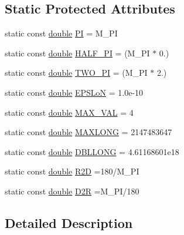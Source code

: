 \subsection*{Static Protected Attributes}
\begin{DoxyCompactItemize}
\item 
static const \hyperlink{_super_l_u_support_8h_a8956b2b9f49bf918deed98379d159ca7}{double} \hyperlink{group___o_p_map_widget_gaab58a4dd2b2aec1a140df479c3da07c5}{P\-I} = M\-\_\-\-P\-I
\item 
static const \hyperlink{_super_l_u_support_8h_a8956b2b9f49bf918deed98379d159ca7}{double} \hyperlink{group___o_p_map_widget_ga767800d1664d3a7d0255a1d1d55bea69}{H\-A\-L\-F\-\_\-\-P\-I} = (M\-\_\-\-P\-I $\ast$ 0.)
\item 
static const \hyperlink{_super_l_u_support_8h_a8956b2b9f49bf918deed98379d159ca7}{double} \hyperlink{group___o_p_map_widget_gac2ca007c6c6f6c095902daca2254d4bb}{T\-W\-O\-\_\-\-P\-I} = (M\-\_\-\-P\-I $\ast$ 2.)
\item 
static const \hyperlink{_super_l_u_support_8h_a8956b2b9f49bf918deed98379d159ca7}{double} \hyperlink{group___o_p_map_widget_ga48583ac82eb87f081f2dc32a9ab39349}{E\-P\-S\-Lo\-N} = 1.\-0e-\/10
\item 
static const \hyperlink{_super_l_u_support_8h_a8956b2b9f49bf918deed98379d159ca7}{double} \hyperlink{group___o_p_map_widget_ga34e30a80435ba07c4e95b56f24935ceb}{M\-A\-X\-\_\-\-V\-A\-L} = 4
\item 
static const \hyperlink{_super_l_u_support_8h_a8956b2b9f49bf918deed98379d159ca7}{double} \hyperlink{group___o_p_map_widget_gad58d07a94d560015458a3411190b5cc0}{M\-A\-X\-L\-O\-N\-G} = 2147483647
\item 
static const \hyperlink{_super_l_u_support_8h_a8956b2b9f49bf918deed98379d159ca7}{double} \hyperlink{group___o_p_map_widget_gaffa95138ab57a5c0267eb66399bbdc5c}{D\-B\-L\-L\-O\-N\-G} = 4.\-61168601e18
\item 
static const \hyperlink{_super_l_u_support_8h_a8956b2b9f49bf918deed98379d159ca7}{double} \hyperlink{group___o_p_map_widget_ga112e42b7b86260ce042d7c14b4ece2b7}{R2\-D} =180/M\-\_\-\-P\-I
\item 
static const \hyperlink{_super_l_u_support_8h_a8956b2b9f49bf918deed98379d159ca7}{double} \hyperlink{group___o_p_map_widget_ga52ec5ac7446a549728bf6e9c798ed6f6}{D2\-R} =M\-\_\-\-P\-I/180
\end{DoxyCompactItemize}


\subsection{Detailed Description}


